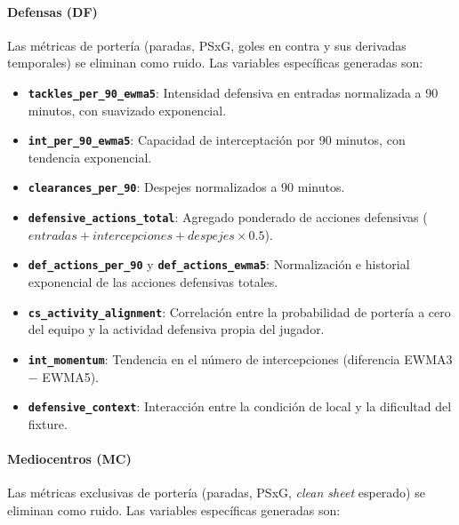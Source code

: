 \paragraph{Defensas (DF)}
 
Las métricas de portería (paradas, PSxG, goles en contra y sus derivadas temporales) se
eliminan como ruido. Las variables específicas generadas son:
 
\begin{itemize}
    \item \textbf{\texttt{tackles\_per\_90\_ewma5}}: Intensidad defensiva en entradas
    normalizada a 90 minutos, con suavizado exponencial.
    \item \textbf{\texttt{int\_per\_90\_ewma5}}: Capacidad de interceptación por 90
    minutos, con tendencia exponencial.
    \item \textbf{\texttt{clearances\_per\_90}}: Despejes normalizados a 90 minutos.
    \item \textbf{\texttt{defensive\_actions\_total}}: Agregado ponderado de acciones
    defensivas ($entradas + intercepciones + despejes \times 0.5$).
    \item \textbf{\texttt{def\_actions\_per\_90}} y \textbf{\texttt{def\_actions\_ewma5}}:
    Normalización e historial exponencial de las acciones defensivas totales.
    \item \textbf{\texttt{cs\_activity\_alignment}}: Correlación entre la probabilidad de
    portería a cero del equipo y la actividad defensiva propia del jugador.
    \item \textbf{\texttt{int\_momentum}}: Tendencia en el número de intercepciones
    (diferencia EWMA3 $-$ EWMA5).
    \item \textbf{\texttt{defensive\_context}}: Interacción entre la condición de local
    y la dificultad del fixture.
\end{itemize}
 
\paragraph{Mediocentros (MC)}
 
Las métricas exclusivas de portería (paradas, PSxG, \textit{clean sheet} esperado) se
eliminan como ruido. Las variables específicas generadas son:
 

